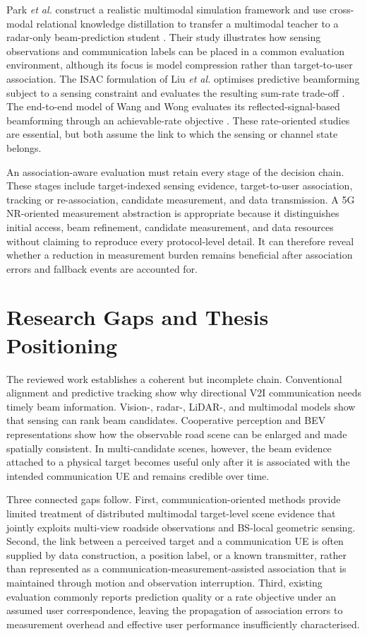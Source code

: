 Park \emph{et al.} construct a realistic multimodal simulation framework and
use cross-modal relational knowledge distillation to transfer a multimodal
teacher to a radar-only beam-prediction student
\cite{park2025resourceefficientbeampredictionmmwave}.  Their study illustrates
how sensing observations and communication labels can be placed in a common
evaluation environment, although its focus is model compression rather than
target-to-user association.  The ISAC formulation of Liu \emph{et al.}
optimises predictive beamforming subject to a sensing constraint and evaluates
the resulting sum-rate trade-off
\cite{liu2022learningbasedpredictivebeamformingintegrated}.  The end-to-end
model of Wang and Wong evaluates its reflected-signal-based beamforming through
an achievable-rate objective \cite{Wang_2023}.  These rate-oriented studies
are essential, but both assume the link to which the sensing or channel state
belongs.

An association-aware evaluation must retain every stage of the decision chain.
These stages include target-indexed sensing evidence, target-to-user association,
tracking or re-association, candidate measurement, and data transmission.  A 5G NR-oriented
measurement abstraction is appropriate because it distinguishes initial access, beam
refinement, candidate measurement, and data resources without claiming to
reproduce every protocol-level detail.  It can therefore reveal whether a
reduction in measurement burden remains beneficial after association errors and
fallback events are accounted for.

\section{Research Gaps and Thesis Positioning}
\label{sec:background-gap}

The reviewed work establishes a coherent but incomplete chain.  Conventional
alignment and predictive tracking show why directional V2I communication needs
timely beam information.  Vision-, radar-, LiDAR-, and multimodal models show
that sensing can rank beam candidates.  Cooperative perception and BEV
representations show how the observable road scene can be enlarged and made
spatially consistent.  In multi-candidate scenes, however, the beam evidence
attached to a physical target becomes useful only after it is associated with
the intended communication UE and remains credible over time.

Three connected gaps follow.  First, communication-oriented methods provide
limited treatment of distributed multimodal target-level scene evidence that
jointly exploits multi-view roadside observations and BS-local geometric
sensing.  Second, the link between a perceived target and a communication UE
is often supplied by data construction, a position label, or a known
transmitter, rather than represented as a communication-measurement-assisted association that
is maintained through motion and observation interruption.  Third, existing
evaluation commonly reports prediction quality or a rate objective under an
assumed user correspondence, leaving the propagation of association errors to
measurement overhead and effective user performance insufficiently
characterised.

